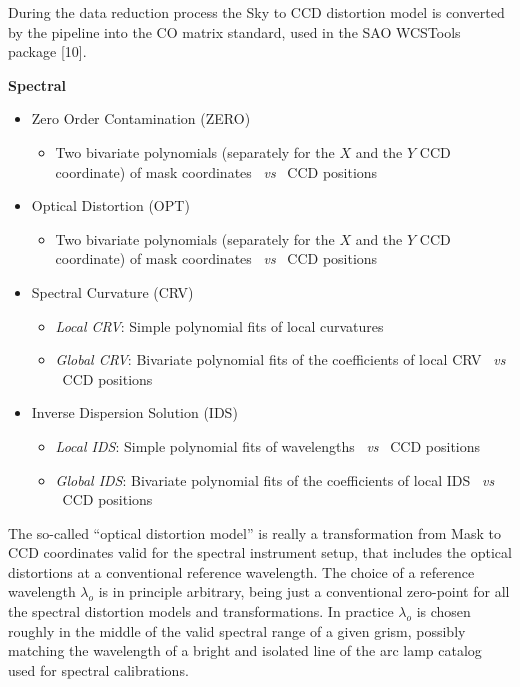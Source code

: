 During the data reduction process the Sky to CCD distortion model is
converted by the pipeline into the CO matrix standard, used in the SAO WCSTools package [10].

\begin{description}
  \item {\bf Spectral}
  \begin{itemize}
    \item Zero Order Contamination (ZERO)
    \begin{itemize}
      \item Two bivariate polynomials (separately for the
            $X$ and the $Y$ CCD coordinate) of mask coordinates \ {\it vs}
            \ CCD positions
    \end{itemize}
    \item Optical Distortion (OPT)
    \begin{itemize}
      \item Two bivariate polynomials (separately for the
            $X$ and the $Y$ CCD coordinate) of mask coordinates \ {\it vs}
            \ CCD positions
    \end{itemize}
    \item Spectral Curvature (CRV)
    \begin{itemize}
      \item {\it Local CRV}: Simple polynomial fits of local curvatures
      \item {\it Global CRV}: Bivariate polynomial fits of the coefficients 
            of local CRV \ {\it vs}
            \ CCD positions
    \end{itemize}
    \item Inverse Dispersion Solution (IDS)
    \begin{itemize}
      \item {\it Local IDS}: Simple polynomial fits of wavelengths \ {\it vs} 
            \ CCD positions
      \item {\it Global IDS}: Bivariate polynomial fits of the coefficients 
            of local IDS \ {\it vs}
            \ CCD positions
    \end{itemize}
  \end{itemize}
\end{description}

The so-called ``optical distortion model'' is really a transformation
from Mask to CCD coordinates valid for the spectral instrument setup, 
that includes the optical distortions at a conventional reference wavelength.
The choice of a reference wavelength $\lambda_o$ is in principle arbitrary,
being just a conventional zero-point for all the spectral distortion
models and transformations. In practice $\lambda_o$ is chosen
roughly in the middle of the valid spectral range of a given grism,
possibly matching the wavelength of a bright and isolated line
of the arc lamp catalog used for spectral calibrations.

